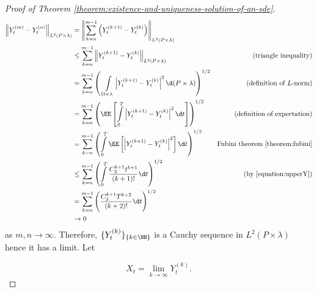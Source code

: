 \begin{proof}[Proof of Theorem \ref{theorem:existence-and-uniqueness-solution-of-an-sde}]
  \begin{align*}
    \left\|Y_t^{(m)}-Y_t^{(n)}\right\|_{L^2(P\times\lambda)}
     & =\left\|\sum\limits_{k=n}^{m-1} \left(Y_t^{(k+1)}-Y_t^{(k)}\right)\right\|_{L^2(P\times\lambda)}                                           &                                            \\
     & \le \sum\limits_{k=n}^{m-1} \left\|Y_t^{(k+1)}-Y_t^{(k)}\right\|_{L^2(P\times\lambda)}                                                     & \text{(triangle inequality)}               \\
     & = \sum\limits_{k=n}^{m-1}\left(\,\,\int\limits_{\Omega\times\lambda} \left|Y_t^{(k+1)}-Y_t^{(k)}\right|^2\d (P\times \lambda)\right)^{1/2} & \text{(definition of $L$-norm)}            \\
     & = \sum\limits_{k=n}^{m-1} \left(\EE\left[\int\limits_0^T\left|Y_t^{(k+1)}-Y_t^{(k)}\right|^2\d t\right]\right)^{1/2}                       & \text{(definition of expectation)}         \\
     & = \sum\limits_{k=n}^{m-1}  \left(\int\limits_0^T\EE\left[\left|Y_t^{(k+1)}-Y_t^{(k)}\right|^2\right]\d t\right)^{1/2}                      & \text{Fubini theorem \ref{theorem:fubini}} \\
     & \le \sum\limits_{k=n}^{m-1}  \left(\int\limits_0^T\dfrac{C_3^{k+1}t^{k+1}}{(k+1)!}\d t\right)^{1/2}                                        & \text{(by \ref{equation:upperY})}          \\
     & = \sum\limits_{k=n}^{m-1}\left(\dfrac{C_3^{k+1}T^{k+2}}{(k+2)!}\d t\right)^{1/2}                                                           &                                            \\
     & \to 0
  \end{align*}
  as $m,n\to\infty$. Therefore, $\{Y_t^{(k)}\}_{\{k\in\NN\}}$ is a Cauchy sequence in $L^2(P\times\lambda)$ hence it has a limit. Let

  $$X_t=\lim\limits_{k\to\infty}Y_t^{(k)}.$$


\end{proof}
